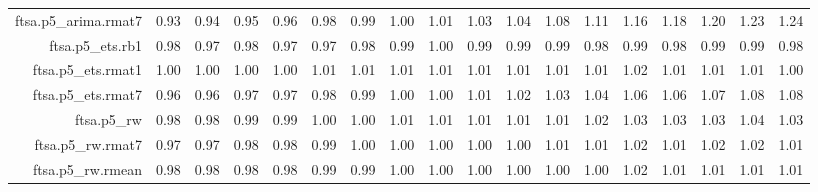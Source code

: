 \begin{tabular}{rrrrrrrrrrrrrrrrrr}
  ftsa.p5\_arima.rmat7 & 0.93 & 0.94 & 0.95 & 0.96 & 0.98 & 0.99 & 1.00 & 1.01 & 1.03 & 1.04 & 1.08 & 1.11 & 1.16 & 1.18 & 1.20 & 1.23 & 1.24 \\ 
  ftsa.p5\_ets.rb1 & 0.98 & 0.97 & 0.98 & 0.97 & 0.97 & 0.98 & 0.99 & 1.00 & 0.99 & 0.99 & 0.99 & 0.98 & 0.99 & 0.98 & 0.99 & 0.99 & 0.98 \\ 
  ftsa.p5\_ets.rmat1 & 1.00 & 1.00 & 1.00 & 1.00 & 1.01 & 1.01 & 1.01 & 1.01 & 1.01 & 1.01 & 1.01 & 1.01 & 1.02 & 1.01 & 1.01 & 1.01 & 1.00 \\ 
  ftsa.p5\_ets.rmat7 & 0.96 & 0.96 & 0.97 & 0.97 & 0.98 & 0.99 & 1.00 & 1.00 & 1.01 & 1.02 & 1.03 & 1.04 & 1.06 & 1.06 & 1.07 & 1.08 & 1.08 \\ 
  ftsa.p5\_rw & 0.98 & 0.98 & 0.99 & 0.99 & 1.00 & 1.00 & 1.01 & 1.01 & 1.01 & 1.01 & 1.01 & 1.02 & 1.03 & 1.03 & 1.03 & 1.04 & 1.03 \\ 
  ftsa.p5\_rw.rmat7 & 0.97 & 0.97 & 0.98 & 0.98 & 0.99 & 1.00 & 1.00 & 1.00 & 1.00 & 1.00 & 1.01 & 1.01 & 1.02 & 1.01 & 1.02 & 1.02 & 1.01 \\ 
  ftsa.p5\_rw.rmean & 0.98 & 0.98 & 0.98 & 0.98 & 0.99 & 0.99 & 1.00 & 1.00 & 1.00 & 1.00 & 1.00 & 1.00 & 1.02 & 1.01 & 1.01 & 1.01 & 1.01 \\ 
   \hline
\end{tabular}
